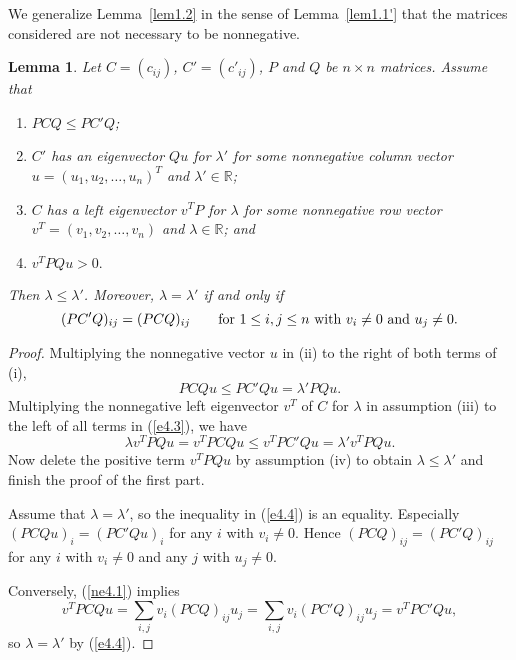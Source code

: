 \documentclass[final,3p, times, 12pt]{elsarticle}
\theoremstyle{plain}
\newtheorem{lem}[thm]{Lemma}
\theoremstyle{definition}
\theoremstyle{remark}
\numberwithin{equation}{section}
\begin{document}
We generalize Lemma~\ref{lem1.2} in the sense of Lemma~\ref{lem1.1'} that the matrices considered are not necessary to be nonnegative.
\begin{lem}\label{nt3.1}
 Let $C=(c_{ij})$, $C'=(c'_{ij})$, $P$ and $Q$ be  $n\times n$ matrices.
Assume that
\begin{enumerate}
\item[(i)]    $PCQ\leq PC'Q$;
\item[(ii)]  $C'$ has an eigenvector $Qu$ for $\lambda'$ for some nonnegative column vector $u=(u_1, u_2, \ldots, u_n)^T$  and $\lambda'\in \mathbb{R}$;
\item[(iii)] $C$ has a left eigenvector $v^TP$ for $\lambda$ for some nonnegative row vector $v^T=(v_1, v_2, \ldots, v_n)$  and  $\lambda\in \mathbb{R}$; and
\item[(iv)] $v^TPQu>0.$
\end{enumerate}
 Then $\lambda\leq \lambda'$.
Moreover, $\lambda=\lambda'$
if and only if
\begin{equation}\label{ne4.1}
(PC'Q)_{ij}=(PCQ)_{ij}\qquad \hbox{for~}1\leq i, j\leq n \hbox{~with~} v_i\ne 0 \hbox{~and~} u_j\ne 0.
\end{equation}
\end{lem}


\begin{proof}
Multiplying the nonnegative vector $u$ in (ii) to the right of both terms of  (i),
\begin{equation}\label{e4.3}
PCQu\leq PC'Qu=\lambda'PQu.
\end{equation}
Multiplying the nonnegative left eigenvector $v^T$ of $C$ for $\lambda$ in assumption (iii) to the left of all terms  in (\ref{e4.3}), we have
\begin{equation}\label{e4.4}\lambda v^TPQu=v^TPCQu\leq v^TPC'Qu=\lambda' v^TPQu.\end{equation}
Now delete the positive term $v^TPQu$ by assumption (iv) to obtain $\lambda\leq \lambda'$ and finish the proof of the first part.

 Assume that $\lambda=\lambda'$, so the inequality in (\ref{e4.4}) is an equality.  Especially $(PCQu)_i=(PC'Qu)_i$
for any $i$ with $v_i\not=0.$ Hence $(PCQ)_{ij}=(PC'Q)_{ij}$ for  any $i$ with $v_i\not=0$ and any $j$ with $u_j\not=0.$





Conversely, (\ref{ne4.1}) implies $$v^TPCQu=\sum_{i,j} v_i(PCQ)_{ij}u_j=\sum_{i,j} v_i(PC'Q)_{ij}u_j=v^TPC'Qu,$$ so
$\lambda=\lambda'$ by (\ref{e4.4}).
\end{proof}
\end{document}
